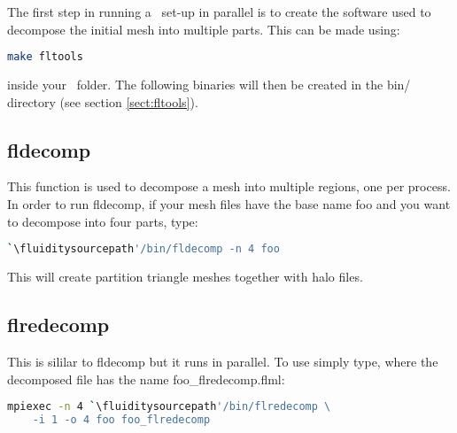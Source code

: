 The first step in running a \fluidity\ set-up in parallel is to create the software
used to decompose the initial mesh into multiple parts. This can be made using:
\begin{lstlisting}[language=bash]
make fltools
\end{lstlisting}
inside your \fluidity\ folder. The following binaries will then be created in the bin/ directory (see section \ref{sect:fltools}).

\subsection{fldecomp}
This function is used to decompose a mesh into multiple regions, one per process. In order to run fldecomp, if your mesh files have the base name foo and you want to decompose into four parts, type:
\begin{lstlisting}[language = Bash]
`\fluiditysourcepath'/bin/fldecomp -n 4 foo
\end{lstlisting}

This will create partition triangle meshes together with halo files. 


\subsection{flredecomp}
\label{mesh!meshing tools!flredecomp}
This is sililar to fldecomp but it runs in parallel. To use simply type, where the decomposed file has the
name foo\_flredecomp.flml:

\begin{lstlisting}[language=bash]
mpiexec -n 4 `\fluiditysourcepath'/bin/flredecomp \
    -i 1 -o 4 foo foo_flredecomp
\end{lstlisting}

